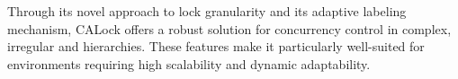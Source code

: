 Through its novel approach to lock granularity and its adaptive labeling mechanism, CALock offers a robust solution for concurrency control in complex, irregular and hierarchies. These features make it particularly well-suited for environments requiring high scalability and dynamic adaptability.










